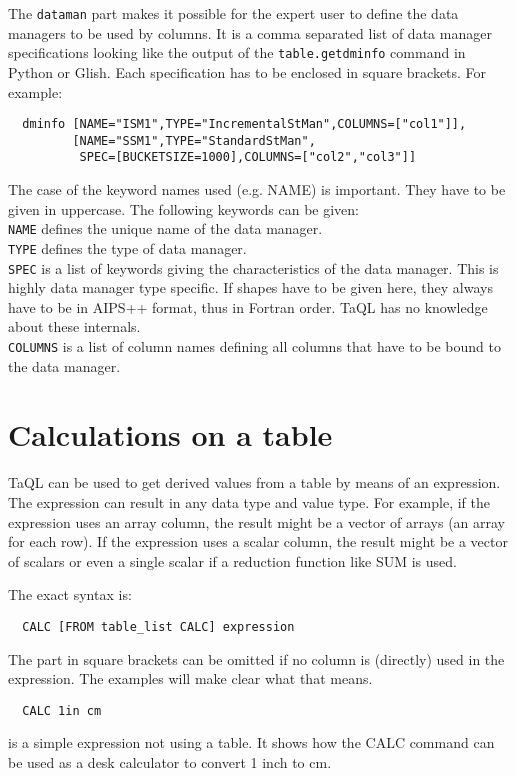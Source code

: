 The \texttt{dataman} part makes it possible for the expert user to
define the data managers to be used by columns. It is a comma separated
list of data manager specifications looking like the output of the
\texttt{table.getdminfo} command in Python or Glish.
Each specification has to be enclosed in square brackets.
For example:
\begin{verbatim}
  dminfo [NAME="ISM1",TYPE="IncrementalStMan",COLUMNS=["col1"]],
         [NAME="SSM1",TYPE="StandardStMan",
          SPEC=[BUCKETSIZE=1000],COLUMNS=["col2","col3"]]
\end{verbatim}
The case of the keyword names used (e.g. NAME) is important.
They have to be given in uppercase. The following keywords can be
given:
\\\texttt{NAME} defines the unique name of the data manager.
\\\texttt{TYPE} defines the type of data manager.
\\\texttt{SPEC} is a list of keywords giving the characteristics of the
data manager. This is highly data manager type specific. If shapes
have to be given here, they always have to be in AIPS++ format,
thus in Fortran order. TaQL has no knowledge about these internals.
\\\texttt{COLUMNS} is a list of column names defining all columns that
have to be bound to the data manager.


\section{\label{TAQL:CALCULATING}Calculations on a table}
TaQL can be used to get derived values from a table by means of an
expression. The expression can result in any data type and value type.
For example, if the expression uses an array column, the result might
be a vector of arrays (an array for each row). If the expression uses
a scalar column, the result might be a vector of scalars or even a
single scalar if a reduction function like SUM is used.

The exact syntax is:
\begin{verbatim}
  CALC [FROM table_list CALC] expression
\end{verbatim}
The part in square brackets can be omitted if no column is (directly)
used in the expression. The examples will make clear what that means.

\begin{verbatim}
  CALC 1in cm
\end{verbatim}
is a simple expression not using a table. It shows how the CALC
command can be used as a desk calculator to convert 1 inch to cm.

